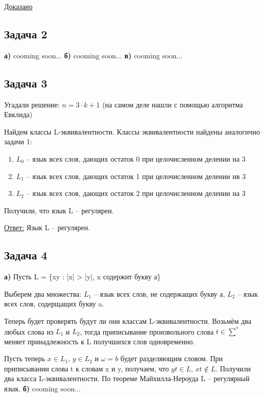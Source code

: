 \documentclass[a4paper,14pt]{article} %
\begin{document}
\underline{Доказано}

\subsection{Задача 2}
\textbf{а)} cooming soon...
\textbf{б)} cooming soon...
\textbf{в)} cooming soon...

\subsection{Задача 3}
Угадали решение: $n = 3 \cdot k + 1$ (на самом деле нашли с помощью алгоритма Евклида)

Найдем классы L-эквивалентности. Классы эквивалентности найдены аналогично задачи 1:
\begin{enumerate}
    \item $L_0$ -- язык всех слов, дающих остаток 0 при целочисленном делении на 3
    \item $L_1$ -- язык всех слов, дающих остаток 1 при целочисленном делении нв 3
    \item $L_2$ -- язык всех слов, дающих остаток 2 при целочисленном делении на 3
\end{enumerate}

Получили, что язык L -- регулярен.

\underline{Ответ:} Язык L -- регулярен.

\subsection{Задача 4}
\textbf{а)}
Пусть L = \{xy : |x| > |y|, x содержит букву а\}

Выберем два множества: $L_1$ -- язык всех слов, не содержащих букву а, $L_2$ -- язык всех слов, содерщащих букву a.

Теперь будет проверять будут ли они классам L-эквивалентности.
Возьмём два любых слова из $L_1$ и $L_2$, тогда приписывание произвольного слова $t \in \sum^*$ меняет принадлежность к L получшихся слов одновременно.

Пусть теперь $x \in L_1$, $y \in L_2$ и $\omega = b$ будет разделяющим словом. При приписывании слова t к словам x и y, получаем, что $yt \in L$, $xt \notin L$.
Получили два класса L-эквивалентности. По теореме Майхилла-Нероуда L -- регулярный язык.
\textbf{б)} cooming soon...
\end{document}

